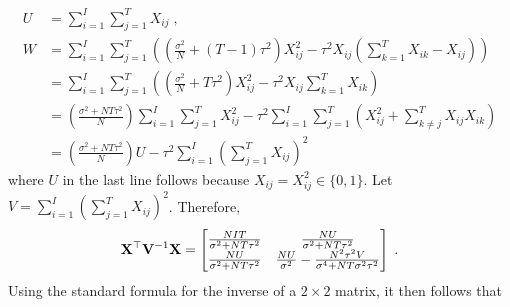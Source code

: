 \documentclass[10pt]{article}
\begin{document}
\begin{align*}
U & = \sum_{i=1}^I\sum_{j=1}^TX_{ij} \;, \\
W &= \sum_{i=1}^I\sum_{j=1}^T\left(\left(\frac{\sigma^2}{N}+(T-1)\tau^2\right)X_{ij}^2 -\tau^2X_{ij}\left(\sum_{k=1}^TX_{ik}-X_{ij}\right)\right) \\
&= \sum_{i=1}^I\sum_{j=1}^T\left(\left(\frac{\sigma^2}{N}+T\tau^2\right)X_{ij}^2 -\tau^2X_{ij}\sum_{k=1}^TX_{ik}\right) \\
&= \left(\frac{\sigma^2+NT\tau^2}{N}\right)\sum_{i=1}^I\sum_{j=1}^TX_{ij}^2 -\tau^2\sum_{i=1}^I\sum_{j=1}^T\left(X_{ij}^2+\sum_{k\neq j}^TX_{ij}X_{ik}\right) \\
&= \left(\frac{\sigma^2+NT\tau^2}{N}\right)U -\tau^2\sum_{i=1}^I\left(\sum_{j=1}^TX_{ij}\right)^2
\end{align*}
where $U$ in the last line follows because $X_{ij}=X_{ij}^2\in\{0,1\}$. Let $V = \sum_{i=1}^I\left(\sum_{j=1}^TX_{ij}\right)^2$. Therefore,
\[
\mathbf{X}^\top\mathbf{V}^{-1}\mathbf{X} =
\begin{bmatrix}
\frac{NIT}{\sigma^2+NT\tau^2} & \frac{NU}{\sigma^2+NT\tau^2} \\
\frac{NU}{\sigma^2+NT\tau^2} & \frac{NU}{\sigma^2} - \frac{N^2\tau^2V}{\sigma^4+NT\sigma^2\tau^2}
\end{bmatrix} \;.
\]
Using the standard formula for the inverse of a $2\times 2$ matrix, it then follows that
\end{document}
